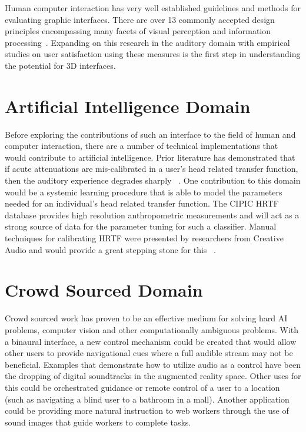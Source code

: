 Human computer interaction has very well established guidelines and methods for
evaluating graphic interfaces. There are over 13 commonly accepted design
principles encompassing many facets of visual perception and information
processing~\cite{wickens2004intro}. Expanding on this research in
the auditory domain with empirical studies on user satisfaction using these
measures is the first step in understanding the potential for 3D interfaces.


\section{                  Artificial Intelligence Domain                     }

Before exploring the contributions of such an interface to the field of human
and computer interaction, there are a number of technical implementations that
would contribute to artificial intelligence.  Prior literature has
demonstrated that if acute attenuations are mis-calibrated in a user's head
related transfer function, then the auditory experience degrades sharply
~\cite{algazi2001cipic}.  One contribution to this domain would be a systemic
learning procedure that is able to model the parameters needed for an
individual's head related transfer function.  The CIPIC HRTF database provides
high resolution anthropometric measurements and will act as a strong source of
data for the parameter tuning for such a classifier.  Manual techniques for
calibrating HRTF were presented by researchers from Creative Audio and would
provide a great stepping stone for this ~\cite{jost2000transaural}.


\section{                  Crowd Sourced Domain                               }

Crowd sourced work has proven to be an effective medium for solving hard AI
problems, computer vision and other computationally ambiguous problems.  With a
binaural interface, a new control mechanism could be created that would allow
other users to provide navigational cues where a full audible stream may not
be beneficial.  Examples that demonstrate how to utilize audio as a control have
been the dropping of digital soundtracks in the augmented reality space.  Other
uses for this could be orchestrated guidance or remote control of a user to a
location (such as navigating a blind user to a bathroom in a mall).  Another
application could be providing more natural instruction to web workers through
the use of sound images that guide workers to complete tasks.

